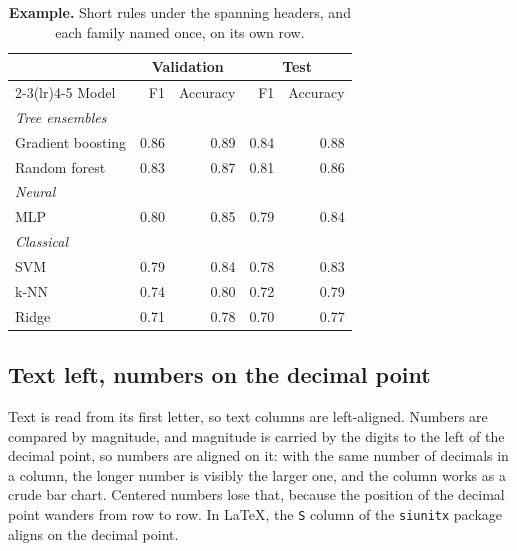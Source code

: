 \begin{table}[ht]
	\vspace{1em}
	\begin{subtable}[t]{\textwidth}
		\centering
		\caption{\textbf{Example.} Short rules under the spanning headers, and each family named once, on its own row.}
		\small
		\begin{tabular}{lrrrr}
			\toprule
			& \multicolumn{2}{c}{Validation} & \multicolumn{2}{c}{Test} \\
			\cmidrule(lr){2-3}\cmidrule(lr){4-5}
			Model & F1 & Accuracy & F1 & Accuracy \\
			\midrule
			\textit{Tree ensembles} & & & & \\
			\tabindent Gradient boosting & 0.86 & 0.89 & 0.84 & 0.88 \\
			\tabindent Random forest & 0.83 & 0.87 & 0.81 & 0.86 \\
			\addlinespace
			\textit{Neural} & & & & \\
			\tabindent MLP & 0.80 & 0.85 & 0.79 & 0.84 \\
			\addlinespace
			\textit{Classical} & & & & \\
			\tabindent SVM & 0.79 & 0.84 & 0.78 & 0.83 \\
			\tabindent k-NN & 0.74 & 0.80 & 0.72 & 0.79 \\
			\tabindent Ridge & 0.71 & 0.78 & 0.70 & 0.77 \\
			\bottomrule
		\end{tabular}
	\end{subtable}
\end{table}

\FloatBarrier
\subsection{Text left, numbers on the decimal point}\label{sec-app-table-align}

Text is read from its first letter, so text columns are left-aligned. Numbers are compared by magnitude, and magnitude is carried by the digits to the left of the decimal point, so numbers are aligned on it: with the same number of decimals in a column, the longer number is visibly the larger one, and the column works as a crude bar chart. Centered numbers lose that, because the position of the decimal point wanders from row to row. In LaTeX, the \texttt{S} column of the \texttt{siunitx} package aligns on the decimal point.

